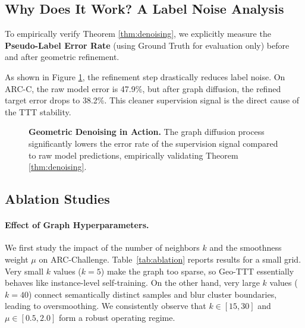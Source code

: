 \documentclass{article}
\theoremstyle{plain}
\theoremstyle{definition}
\theoremstyle{remark}
\begin{document}
\subsection{Why Does It Work? A Label Noise Analysis}

To empirically verify Theorem \ref{thm:denoising}, we explicitly measure the \textbf{Pseudo-Label Error Rate} (using Ground Truth for evaluation only) before and after geometric refinement.

As shown in Figure \ref{fig:label_error}, the refinement step drastically reduces label noise. On ARC-C, the raw model error is 47.9\%, but after graph diffusion, the refined target error drops to 38.2\%. This cleaner supervision signal is the direct cause of the TTT stability.

\begin{figure}[h]
    \centering
    \caption{\textbf{Geometric Denoising in Action.} The graph diffusion process significantly lowers the error rate of the supervision signal compared to raw model predictions, empirically validating Theorem \ref{thm:denoising}.}
    \label{fig:label_error}
\end{figure}

\subsection{Ablation Studies}
\label{sec:ablation}

\paragraph{Effect of Graph Hyperparameters.}
We first study the impact of the number of neighbors $k$ and the smoothness weight $\mu$ on ARC-Challenge. Table~\ref{tab:ablation} reports results for a small grid. Very small $k$ values ($k=5$) make the graph too sparse, so Geo-TTT essentially behaves like instance-level self-training. On the other hand, very large $k$ values ($k=40$) connect semantically distinct samples and blur cluster boundaries, leading to oversmoothing. We consistently observe that $k \in [15, 30]$ and $\mu \in [0.5, 2.0]$ form a robust operating regime.
\end{document}
